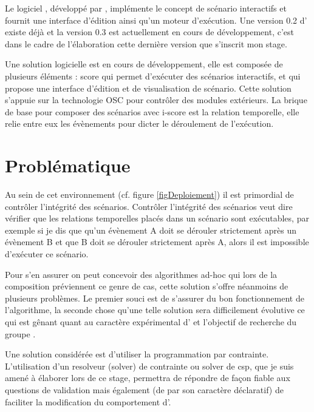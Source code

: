 Le logiciel \iscore{}, développé par \ossia{}, implémente le concept de scénario interactifs et fournit une interface d'édition ainsi qu'un moteur d'exécution. Une version 0.2 d'\iscore{} existe déjà et la version 0.3 est actuellement en cours de développement, c'est dans le cadre de l'élaboration cette dernière version que s'inscrit mon stage. 



Une solution logicielle est en cours de développement, elle est composée de plusieurs éléments : score qui permet d'exécuter des scénarios interactifs, et \iscore{} qui propose une interface d'édition et de visualisation de scénario. Cette solution s'appuie sur la technologie OSC pour contrôler des modules extérieurs. La brique de base pour composer des scénarios avec i-score est la relation temporelle, elle relie entre eux les évènements pour dicter le déroulement de l'exécution.



\section*{Problématique}

Au sein de cet environnement (cf. figure \ref{figDeploiement}) il est primordial de contrôler l'intégrité des scénarios. Contrôler l'intégrité des scénarios veut dire vérifier que les relations temporelles placés dans un scénario sont exécutables, par exemple si je dis que qu'un évènement A doit se dérouler strictement après un évènement B et que B doit se dérouler strictement après A, alors il est impossible d'exécuter ce scénario.

Pour s'en assurer on peut concevoir des algorithmes ad-hoc qui lors de la composition préviennent ce genre de cas, cette solution s'offre néanmoins de plusieurs problèmes. Le premier souci est de s'assurer du bon fonctionnement de l'algorithme, la seconde chose qu'une telle solution sera difficilement évolutive ce qui est gênant quant au caractère expérimental d'\iscore{} et l'objectif de recherche du groupe \ossia{}.

Une solution considérée est d'utiliser la programmation par contrainte. L'utilisation d'un resolveur (solver) de contrainte ou solver de \acrshort{csp}, que je suis amené à élaborer lors de ce stage, permettra de répondre de façon fiable aux questions de validation mais également (de par son caractère déclaratif) de faciliter la modification du comportement d'\iscore{}.

